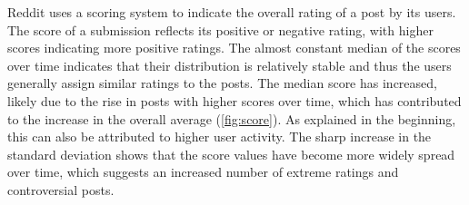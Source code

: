 \documentclass[11pt,a4paper]{article}
\begin{document}
Reddit uses a scoring system to indicate the overall rating of a post by its users. The score of a submission reflects its positive or negative rating, with higher scores indicating more positive ratings. The almost constant median of the scores over time indicates that their distribution is relatively stable and thus the users generally assign similar ratings to the posts. The median score has increased, likely due to the rise in posts with higher scores over time, which has contributed to the increase in the overall average (\autoref{fig:score}). As explained in the beginning, this can also be attributed to higher user activity. The sharp increase in the standard deviation shows that the score values have become more widely spread over time, which suggests an increased number of extreme ratings and controversial posts.
\end{document}
